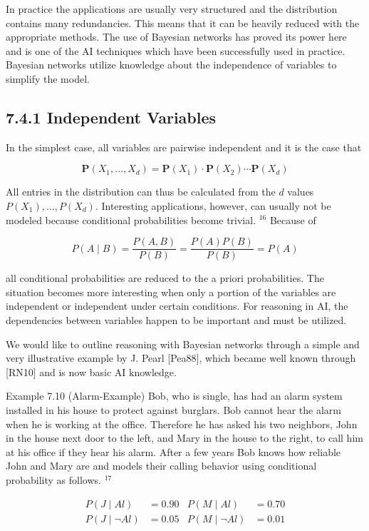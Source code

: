 \documentclass[10pt]{book}
\begin{document}
\begin{center}
\begin{enumerate}
In practice the applications are usually very structured and the distribution contains many redundancies. This means that it can be heavily reduced with the appropriate methods. The use of Bayesian networks has proved its power here and is one of the AI techniques which have been successfully used in practice. Bayesian networks utilize knowledge about the independence of variables to simplify the model.

\subsection*{7.4.1 Independent Variables}
In the simplest case, all variables are pairwise independent and it is the case that

$$
\boldsymbol{P}\left(X_{1}, \ldots, X_{d}\right)=\boldsymbol{P}\left(X_{1}\right) \cdot \boldsymbol{P}\left(X_{2}\right) \cdots \boldsymbol{P}\left(X_{d}\right)
$$

All entries in the distribution can thus be calculated from the $d$ values $P\left(X_{1}\right), \ldots, P\left(X_{d}\right)$. Interesting applications, however, can usually not be modeled because conditional probabilities become trivial. ${ }^{16}$ Because of


$$
P(A \mid B)=\frac{P(A, B)}{P(B)}=\frac{P(A) P(B)}{P(B)}=P(A)
$$

all conditional probabilities are reduced to the a priori probabilities. The situation becomes more interesting when only a portion of the variables are independent or independent under certain conditions. For reasoning in AI, the dependencies between variables happen to be important and must be utilized.

We would like to outline reasoning with Bayesian networks through a simple and very illustrative example by J. Pearl [Pea88], which became well known through [RN10] and is now basic AI knowledge.

Example 7.10 (Alarm-Example) Bob, who is single, has had an alarm system installed in his house to protect against burglars. Bob cannot hear the alarm when he is working at the office. Therefore he has asked his two neighbors, John in the house next door to the left, and Mary in the house to the right, to call him at his office if they hear his alarm. After a few years Bob knows how reliable John and Mary are and models their calling behavior using conditional probability as follows. ${ }^{17}$

$$
\begin{array}{rlrl}
P(J \mid A l) & =0.90 & P(M \mid A l) & =0.70 \\
P(J \mid \neg A l) & =0.05 & P(M \mid \neg A l) & =0.01
\end{array}
$$


\end{enumerate}
\end{center}
\end{document}
